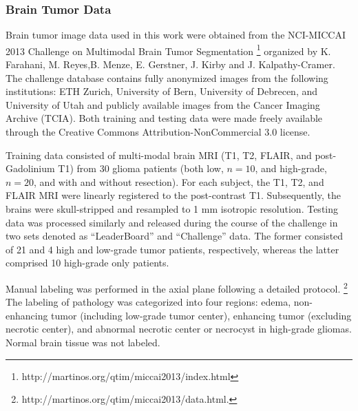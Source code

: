 \documentclass[final,5p,times,twocolumn]{elsarticle}
\begin{document}
\subsubsection{Brain Tumor Data}

Brain tumor image data used in this work were obtained from the NCI-MICCAI 2013 
Challenge on Multimodal Brain Tumor Segmentation%
\footnote{
http://martinos.org/qtim/miccai2013/index.html
}
organized by K. Farahani, M. Reyes,B. Menze, E. Gerstner, J. Kirby and J. Kalpathy-Cramer. The challenge database contains fully anonymized images from the following institutions: 
ETH Zurich, University of Bern, University of Debrecen, and University of Utah and 
publicly available images from the Cancer Imaging Archive (TCIA).  Both training 
and testing data were made freely available through the Creative Commons Attribution-NonCommercial 3.0 license.

Training data consisted of multi-modal brain MRI (T1, T2, FLAIR, and 
post-Gadolinium T1) from 30 glioma patients (both low, $n=10$, and high-grade, $n=20$,
and with and without resection).  For each subject, the T1, T2, and 
FLAIR MRI were linearly registered to the post-contrast T1.  Subsequently,
the brains were skull-stripped and resampled to 1 mm isotropic resolution.
Testing data was processed similarly and released during the course of the
challenge in two sets denoted as ``LeaderBoard'' and ``Challenge'' data.  
The former consisted of 21 and 4 high and low-grade tumor patients, respectively,
whereas the latter comprised 10 high-grade only patients.

Manual labeling was performed in the axial plane following a detailed
protocol.%
\footnote{
http://martinos.org/qtim/miccai2013/data.html.
}
The labeling of pathology was categorized into four regions:
edema, non-enhancing tumor (including low-grade tumor center), 
enhancing tumor (excluding necrotic center), and abnormal
necrotic center or necrocyst in high-grade gliomas.
Normal brain tissue was not labeled. 
\end{document}
